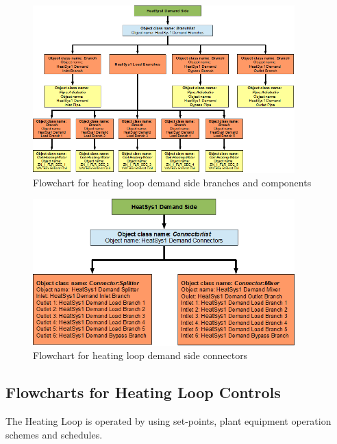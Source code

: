 \begin{figure}[hbtp] %
\centering
\includegraphics[width=0.9\textwidth, height=0.9\textheight, keepaspectratio=true]{media/image081.png}
\caption{Flowchart for heating loop demand side branches and components \protect \label{fig:flowchart-for-heating-loop-demand-side-branches-and}}
\end{figure}

\begin{figure}[hbtp] %
\centering
\includegraphics[width=0.9\textwidth, height=0.9\textheight, keepaspectratio=true]{media/image082.png}
\caption{Flowchart for heating loop demand side connectors \protect \label{fig:flowchart-for-heating-loop-demand-side-connectors}}
\end{figure}

\subsection{Flowcharts for Heating Loop Controls}\label{flowcharts-for-heating-loop-controls}

The Heating Loop is operated by using set-points, plant equipment operation schemes and schedules.

